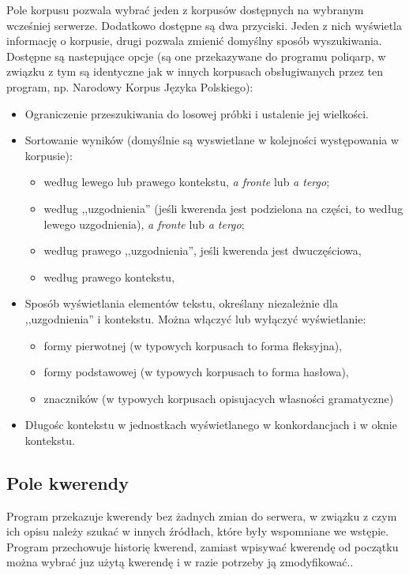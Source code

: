 \documentclass{mwart}
\begin{document}
Pole korpusu pozwala wybrać jeden z korpusów dostępnych na wybranym
wcześniej serwerze. Dodatkowo dostępne są dwa przyciski. Jeden z nich
wyświetla informację o korpusie, drugi pozwala zmienić domyślny sposób
wyszukiwania. Dostępne są nastepujące opcje (są one przekazywane do
programu \textsf{poliqarp}, w związku z tym są identyczne jak w innych
korpusach obsługiwanych przez ten program, np. Narodowy Korpus Języka
Polskiego):
\begin{itemize}
\item Ograniczenie przeszukiwania do losowej próbki i ustalenie jej wielkości.
\item Sortowanie wyników (domyślnie są wyswietlane w kolejności
  występowania w korpusie):
  \begin{itemize}
  \item według lewego lub prawego kontekstu, \textit{a fronte} lub
    \textit{a tergo};
  \item według ,,uzgodnienia'' (jeśli kwerenda jest podzielona na
    części, to według lewego uzgodnienia), \textit{a fronte} lub
    \textit{a tergo};
  \item według prawego ,,uzgodnienia'', jeśli kwerenda jest
    dwuczęściowa,
  \item według prawego kontekstu,
  \end{itemize}
\item Sposób wyświetlania elementów tekstu, określany niezależnie dla
  ,,uzgodnienia'' i kontekstu. Można włączyć lub wyłączyć
  wyświetlanie:
  \begin{itemize}
  \item formy pierwotnej (w typowych korpusach to forma fleksyjna),
  \item formy podstawowej (w typowych korpusach to forma hasłowa),
  \item znaczników (w typowych korpusach opisujacych własności gramatyczne)
  \end{itemize}
\item Długośc kontekstu w jednostkach wyświetlanego w konkordancjach i
  w oknie kontekstu.
\end{itemize}

\subsection{Pole kwerendy}
\label{sec:pole-kwerendy}

Program przekazuje kwerendy bez żadnych zmian do serwera, w związku z
czym ich opisu należy szukać w innych źródłach, które były wspomniane
we wstępie. Program przechowuje historię kwerend, zamiast wpisywać
kwerendę od początku można wybrać juz użytą kwerendę i w razie
potrzeby ją zmodyfikować..
\end{document}
